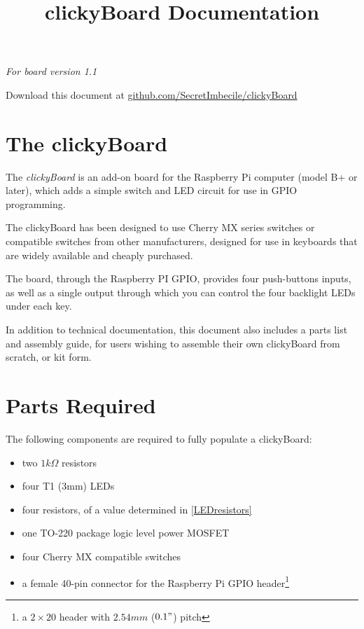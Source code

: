\documentclass[10pt, a4paper, onesided]{article}
\title{\textbf{clickyBoard} Documentation}
\author{}
\date{}
\begin{document}
\maketitle
\vspace{-60pt}

\begin{center}
	\textit{For board version 1.1}
\end{center}
\vspace{-12pt}
Download this document at \href{https://github.com/SecretImbecile/clickyBoard}{github.com/SecretImbecile/clickyBoard}
\tableofcontents

\section{The clickyBoard}

	The \textit{clickyBoard} is an add-on board for the Raspberry Pi computer (model B+ or later), which adds a simple switch and LED circuit for use in GPIO programming.
	
	The clickyBoard has been designed to use Cherry MX series switches or compatible switches from other manufacturers, designed for use in keyboards that are widely available and cheaply purchased.
	
	The board, through the Raspberry PI GPIO, provides four push-buttons inputs, as well as a single output through which you can control the four backlight LEDs under each key.
	
	In addition to technical documentation, this document also includes a parts list and assembly guide, for users wishing to assemble their own clickyBoard from scratch, or kit form.

\newpage
\section{Parts Required}

	The following components are required to fully populate a clickyBoard:
	
	\begin{itemize}[noitemsep]
		\item two $1 k\Omega$ resistors
		\item four T1 (3mm) LEDs
		\item four resistors, of a value determined in \autoref{LEDresistors}
		\item one TO-220 package logic level power MOSFET
		\item four Cherry MX compatible switches
		\item a female 40-pin connector for the Raspberry Pi GPIO header\footnote{a $2\times20$ header with $2.54 mm$ ($0.1"$) pitch}
	\end{itemize}
	
\end{document}
